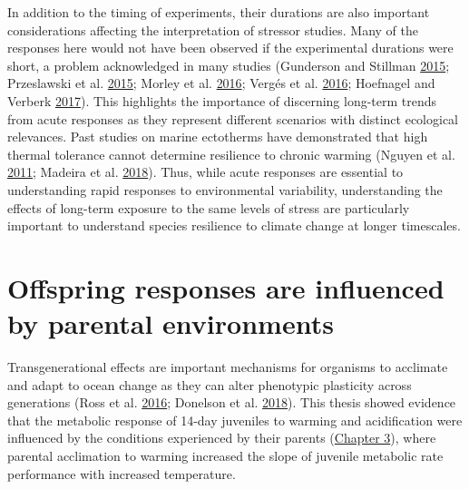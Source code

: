 \documentclass[a4paper,10pt, oneside]{memoir}
\begin{document}
In addition to the timing of experiments, their durations are also important considerations affecting the interpretation of stressor studies.
Many of the responses here would not have been observed if the experimental durations were short, a problem acknowledged in many studies (Gunderson and Stillman \protect\hyperlink{ref-Gunderson2015}{2015}; Przeslawski et al. \protect\hyperlink{ref-Przeslawski2015}{2015}; Morley et al. \protect\hyperlink{ref-Morley2016}{2016}; Vergés et al. \protect\hyperlink{ref-Verges2016}{2016}; Hoefnagel and Verberk \protect\hyperlink{ref-Hoefnagel2017}{2017}).
This highlights the importance of discerning long-term trends from acute responses as they represent different scenarios with distinct ecological relevances.
Past studies on marine ectotherms have demonstrated that high thermal tolerance cannot determine resilience to chronic warming (Nguyen et al. \protect\hyperlink{ref-Nguyen2011}{2011}; Madeira et al. \protect\hyperlink{ref-Madeira2018}{2018}).
Thus, while acute responses are essential to understanding rapid responses to environmental variability, understanding the effects of long-term exposure to the same levels of stress are particularly important to understand species resilience to climate change at longer timescales.

\hypertarget{offspring-responses-are-influenced-by-parental-environments}{%
\section{Offspring responses are influenced by parental environments}\label{offspring-responses-are-influenced-by-parental-environments}}

Transgenerational effects are important mechanisms for organisms to acclimate and adapt to ocean change as they can alter phenotypic plasticity across generations (Ross et al. \protect\hyperlink{ref-Ross2016}{2016}; Donelson et al. \protect\hyperlink{ref-Donelson2018}{2018}).
This thesis showed evidence that the metabolic response of 14-day juveniles to warming and acidification were influenced by the conditions experienced by their parents (\protect\hyperlink{multistressor}{Chapter 3}), where parental acclimation to warming increased the slope of juvenile metabolic rate performance with increased temperature.
\end{document}
